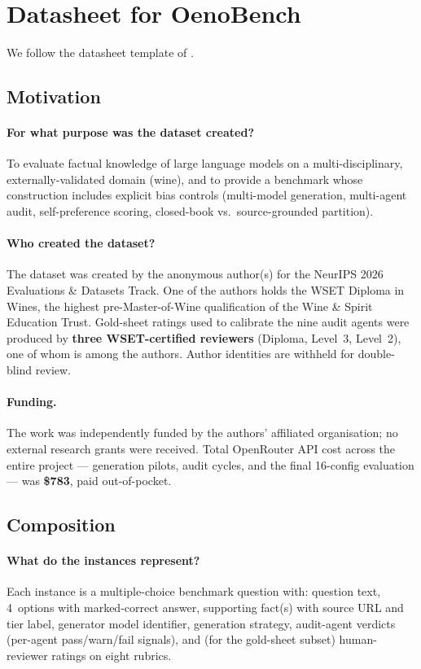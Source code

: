 \section{Datasheet for OenoBench}
\label{app:datasheet}

We follow the datasheet template of \citet{gebru2021datasheets}.

\subsection{Motivation}
\paragraph{For what purpose was the dataset created?}
To evaluate factual knowledge of large language models on a multi-disciplinary,
externally-validated domain (wine), and to provide a benchmark whose
construction includes explicit bias controls (multi-model generation,
multi-agent audit, self-preference scoring, closed-book vs.\ source-grounded
partition).

\paragraph{Who created the dataset?}
The dataset was created by the anonymous author(s) for the NeurIPS 2026
Evaluations \& Datasets Track. One of the authors holds the WSET Diploma
in Wines, the highest pre-Master-of-Wine qualification of the Wine \&
Spirit Education Trust. Gold-sheet ratings used to calibrate the nine
audit agents were produced by \textbf{three WSET-certified reviewers}
(Diploma, Level~3, Level~2), one of whom is among the authors. Author
identities are withheld for double-blind review.

\paragraph{Funding.}
The work was independently funded by the authors' affiliated
organisation; no external research grants were received. Total
OpenRouter API cost across the entire project --- generation pilots,
audit cycles, and the final 16-config evaluation --- was \textbf{\$783},
paid out-of-pocket.

\subsection{Composition}
\paragraph{What do the instances represent?}
Each instance is a multiple-choice benchmark question with: question
text, 4~options with marked-correct answer, supporting fact(s) with
source URL and tier label, generator model identifier, generation
strategy, audit-agent verdicts (per-agent pass/warn/fail signals), and
(for the gold-sheet subset) human-reviewer ratings on eight rubrics.

